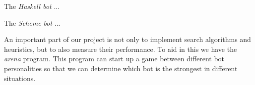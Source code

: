 The \emph{Haskell bot} ... %

The \emph{Scheme bot} ... %

An important part of our project is not only to implement search
algorithms and heuristics, but to also measure their performance. To
aid in this we have the \emph{arena} program. This program can start
up a game between different bot personalities so that we can determine
which bot is the strongest in different situations.

